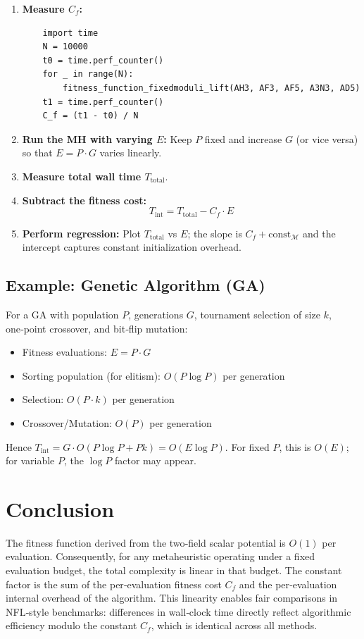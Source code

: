 \documentclass[11pt]{article}
\begin{document}
\begin{enumerate}
    \item \textbf{Measure $C_f$:}
    \begin{lstlisting}
    import time
    N = 10000
    t0 = time.perf_counter()
    for _ in range(N):
        fitness_function_fixedmoduli_lift(AH3, AF3, AF5, A3N3, AD5)
    t1 = time.perf_counter()
    C_f = (t1 - t0) / N
    \end{lstlisting}
    \item \textbf{Run the MH with varying $E$:} Keep $P$ fixed and increase $G$ (or vice versa) so that $E = P \cdot G$ varies linearly.
    \item \textbf{Measure total wall time $T_{\text{total}}$}.
    \item \textbf{Subtract the fitness cost:}
    \[
    T_{\text{int}} = T_{\text{total}} - C_f \cdot E
    \]
    \item \textbf{Perform regression:} Plot $T_{\text{total}}$ vs $E$; the slope is $C_f + \text{const}_{\mathcal{M}}$ and the intercept captures constant initialization overhead.
\end{enumerate}

\subsection{Example: Genetic Algorithm (GA)}
For a GA with population $P$, generations $G$, tournament selection of size $k$, one‑point crossover, and bit‑flip mutation:
\begin{itemize}
    \item Fitness evaluations: $E = P \cdot G$
    \item Sorting population (for elitism): $O(P \log P)$ per generation
    \item Selection: $O(P \cdot k)$ per generation
    \item Crossover/Mutation: $O(P)$ per generation
\end{itemize}
Hence $T_{\text{int}} = G \cdot O(P \log P + P k) = O(E \log P)$. For fixed $P$, this is $O(E)$; for variable $P$, the $\log P$ factor may appear.

\section{Conclusion}
The fitness function derived from the two‑field scalar potential is $O(1)$ per evaluation. Consequently, for any metaheuristic operating under a fixed evaluation budget, the total complexity is linear in that budget. The constant factor is the sum of the per‑evaluation fitness cost $C_f$ and the per‑evaluation internal overhead of the algorithm. This linearity enables fair comparisons in NFL‑style benchmarks: differences in wall‑clock time directly reflect algorithmic efficiency modulo the constant $C_f$, which is identical across all methods.
\end{document}
